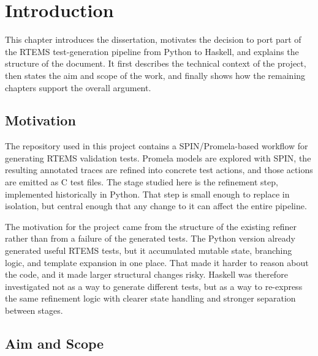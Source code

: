 \chapter{Introduction}
\label{chap:Introduction}


This chapter introduces the dissertation, motivates the decision to port part of the RTEMS test-generation pipeline from Python to Haskell, and explains the structure of the document. It first describes the technical context of the project, then states the aim and scope of the work, and finally shows how the remaining chapters support the overall argument.

\section{Motivation}

The repository used in this project contains a SPIN/Promela-based workflow for generating RTEMS validation tests. Promela models are explored with SPIN, the resulting annotated traces are refined into concrete test actions, and those actions are emitted as C test files. The stage studied here is the refinement step, implemented historically in Python. That step is small enough to replace in isolation, but central enough that any change to it can affect the entire pipeline.

The motivation for the project came from the structure of the existing refiner rather than from a failure of the generated tests. The Python version already generated useful RTEMS tests, but it accumulated mutable state, branching logic, and template expansion in one place. That made it harder to reason about the code, and it made larger structural changes risky. Haskell was therefore investigated not as a way to generate different tests, but as a way to re-express the same refinement logic with clearer state handling and stronger separation between stages.

\section{Aim and Scope}

